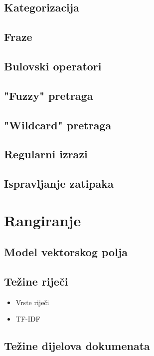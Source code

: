 \documentclass[11pt]{scrreprt}
\begin{document}
\subsection{Kategorizacija}

\subsection{Fraze}

\subsection{Bulovski operatori}

\subsection{"Fuzzy" pretraga}

\subsection{"Wildcard" pretraga}

\subsection{Regularni izrazi}

\subsection{Ispravljanje zatipaka}

\section{Rangiranje}

\subsection{Model vektorskog polja}

\subsection{Težine riječi}

\begin{itemize}
  \item Vrste riječi
  \item TF-IDF
\end{itemize}

\subsection{Težine dijelova dokumenata}
\end{document}
